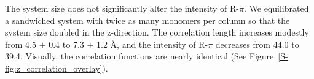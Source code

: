 \documentclass[journal=jpcbfk,manusciprt=article]{achemso}
\begin{document}
  The system size does not significantly alter the intensity of R-$\pi$. We equilibrated a 
  sandwiched system with twice as many monomers per column so that the system size doubled in 
  the z-direction. The correlation length increases modestly from 4.5 $\pm$ 0.4 to 7.3 $\pm$ 1.2 \AA, 
  and the intensity of R-$\pi$ decreases from 44.0 to 39.4. Visually, the correlation functions
  are nearly identical (See Figure~\ref{S-fig:z_correlation_overlay}). 
  
  
  
\end{document}
